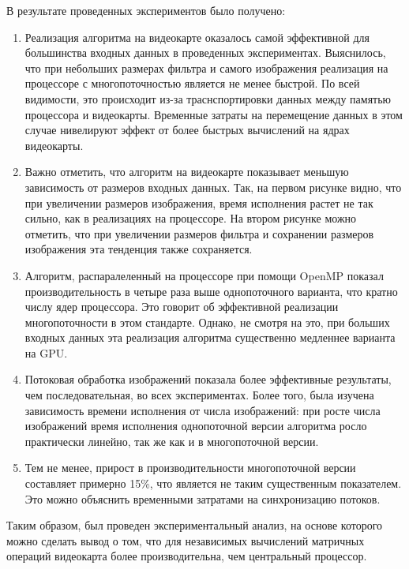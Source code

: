 \clearpage
{}

В результате проведенных экспериментов было получено:

\begin{enumerate}
    \item Реализация алгоритма на видеокарте оказалось самой эффективной для большинства входных данных в проведенных экспериментах. 
    Выяснилось, что при небольших размерах фильтра и самого изображения реализация на процессоре с многопоточностью является не менее быстрой. 
    По всей видимости, это происходит из-за траснспортировки данных между памятью процессора и видеокарты. Временные затраты на перемещение 
    данных в этом случае нивелируют эффект от более быстрых вычислений на ядрах видеокарты.
    
    \item Важно отметить, что алгоритм на видеокарте показывает меньшую зависимость от размеров входных данных. Так, на первом рисунке видно, 
    что при увеличении размеров изображения, время исполнения растет не так сильно, как в реализациях на процессоре. На втором рисунке можно 
    отметить, что при увеличении размеров фильтра и сохранении размеров изображения эта тенденция также сохраняется.
    
    \item Алгоритм, распаралеленный на процессоре при помощи OpenMP показал производительность в четыре раза выше однопоточного варианта, что кратно числу ядер 
    процессора. Это говорит об эффективной реализации многопоточности в этом стандарте. Однако, не смотря на это, при больших входных данных 
    эта реализация алгоритма существенно медленнее варианта на GPU.

    \item Потоковая обработка изображений показала более эффективные результаты, чем последовательная, во всех экспериментах. Более того, 
    была изучена зависимость времени исполнения от числа изображений: при росте числа изображений время исполнения однопоточной версии алгоритма 
    росло практически линейно, так же как и в многопоточной версии.
    
    \item Тем не менее, прирост в производительности многопоточной версии составляет примерно 15\%, что является не таким существенным показателем. 
    Это можно объяснить временными затратами на синхронизацию потоков.
    
\end{enumerate}

Таким образом, был проведен экспериментальный анализ, на основе которого можно сделать вывод о том, что для независимых вычислений матричных 
операций видеокарта более производительна, чем центральный процессор.
\clearpage